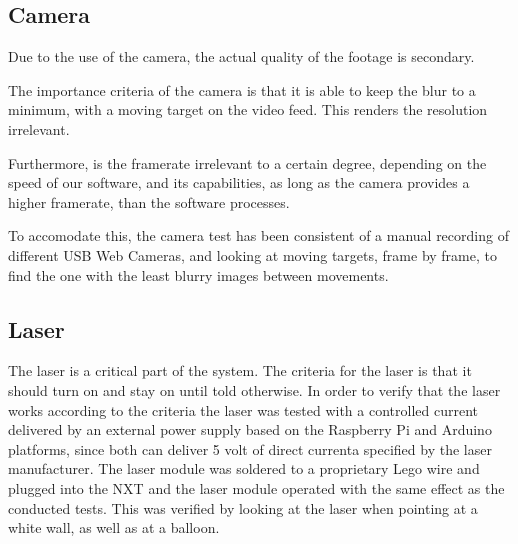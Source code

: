 \subsection*{Camera}
Due to the use of the camera, the actual quality of the footage is secondary.

The importance criteria of the camera is that it is able to keep the blur to a minimum, with a moving target on the video feed.
This renders the resolution irrelevant.

Furthermore, is the framerate irrelevant to a certain degree, depending on the speed of our software, and its capabilities, as long as the camera provides a higher framerate, than the software processes.

To accomodate this, the camera test has been consistent of a manual recording of different USB Web Cameras, and looking at moving targets, frame by frame, to find the one with the least blurry images between movements.

\subsection*{Laser}
The laser is a critical part of the system.
The criteria for the laser is that it should turn on and stay on until told otherwise. 
In order to verify that the laser works according to the criteria the laser was tested with a controlled current delivered by an external power supply based on the  Raspberry Pi and Arduino platforms, since both can deliver 5 volt of direct currenta specified by the laser manufacturer\cite{RaspberryPi}\cite{ArduinoUno}.
The laser module was soldered to a proprietary Lego wire and plugged into the NXT and the laser module operated with the same effect as the conducted tests. 
This was verified by looking at the laser when pointing at a white wall, as well as at a balloon.
